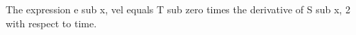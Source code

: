 The expression e sub x, vel equals T sub zero times the derivative of S sub x, 2 with respect to time.